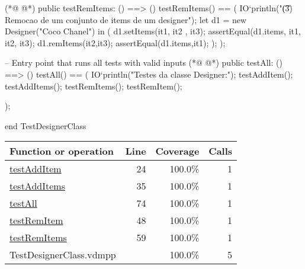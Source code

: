 \begin{vdmpp}[breaklines=true]
(*@
\label{testRemItems:59}
@*)
 public testRemItems: () ==> ()
 testRemItems() == (
  IO`println("\t (3) Remocao de um conjunto de items de um designer");
   let d1 = new Designer("Coco Chanel") in (
    d1.setItems({it1, it2 , it3});
    assertEqual(d1.items, {it1, it2, it3});
    d1.remItems({it2,it3});
    assertEqual(d1.items,{it1});
  );
 );
 

 
 
 -- Entry point that runs all tests with valid inputs
(*@
\label{testAll:74}
@*)
  public testAll: () ==> ()
  testAll() == (
  IO`println("Testes da classe Designer:");
    testAddItem();
    testAddItems();
    testRemItems();
    testRemItem();
    
  );
 
end TestDesignerClass
\end{vdmpp}
\bigskip
\begin{longtable}{|l|r|r|r|}
\hline
Function or operation & Line & Coverage & Calls \\
\hline
\hline
\hyperref[testAddItem:24]{testAddItem} & 24&100.0\% & 1 \\
\hline
\hyperref[testAddItems:35]{testAddItems} & 35&100.0\% & 1 \\
\hline
\hyperref[testAll:74]{testAll} & 74&100.0\% & 1 \\
\hline
\hyperref[testRemItem:48]{testRemItem} & 48&100.0\% & 1 \\
\hline
\hyperref[testRemItems:59]{testRemItems} & 59&100.0\% & 1 \\
\hline
\hline
TestDesignerClass.vdmpp & & 100.0\% & 5 \\
\hline
\end{longtable}

